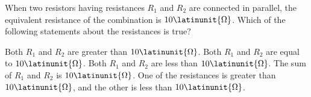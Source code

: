 \begin{questions}\setcounter{question}{16}\question
When two resistors having resistances $R_{1}$ and $R_{2}$ are connected in parallel, the equivalent resistance of the combination is $10\latinunit{\Omega}$. Which of the following statements about the resistances is true?

\begin{choices}
\choice Both $R_{1}$ and $R_{2}$ are greater than $10\latinunit{\Omega}$.
\choice Both $R_{1}$ and $R_{2}$ are equal to $10\latinunit{\Omega}$.
\choice Both $R_{1}$ and $R_{2}$ are less than $10\latinunit{\Omega}$.
\choice The sum of $R_{1}$ and $R_{2}$ is $10\latinunit{\Omega}$.
\choice One of the resistances is greater than $10\latinunit{\Omega}$, and the other is less than $10\latinunit{\Omega}$.
\end{choices}\end{questions}

